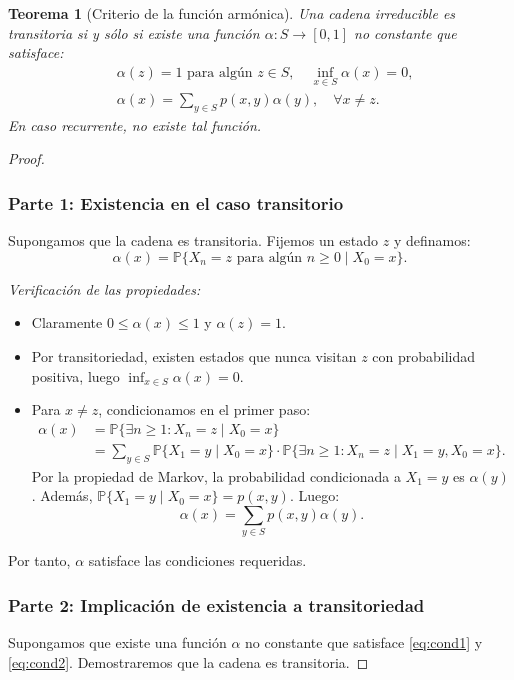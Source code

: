 \documentclass[11pt,a4paper]{article}
\theoremstyle{plain}
\newtheorem{teorema}{Teorema}[section]
\theoremstyle{definition}
\theoremstyle{remark}
\newcommand{\1}{\mathds{1}}
\begin{document}
\begin{teorema}[Criterio de la función armónica]
Una cadena irreducible es transitoria si y sólo si existe una función \(\alpha: S \to [0,1]\) no constante que satisface:
\begin{align}
&\alpha(z) = 1 \text{ para algún } z \in S, \quad \inf_{x\in S} \alpha(x) = 0, \label{eq:cond1}\\
&\alpha(x) = \sum_{y\in S} p(x,y)\alpha(y), \quad \forall x \neq z. \label{eq:cond2}
\end{align}
En caso recurrente, no existe tal función.
\end{teorema}

\begin{proof}
\subsubsection*{Parte 1: Existencia en el caso transitorio}
Supongamos que la cadena es transitoria. Fijemos un estado \(z\) y definamos:
\[
\alpha(x) = \mathbb{P}\{X_n = z \text{ para algún } n \geq 0 \mid X_0 = x\}.
\]

\emph{Verificación de las propiedades:}
\begin{itemize}
\item Claramente \(0 \leq \alpha(x) \leq 1\) y \(\alpha(z) = 1\).
\item Por transitoriedad, existen estados que nunca visitan \(z\) con probabilidad positiva, luego \(\inf_{x\in S} \alpha(x) = 0\).
\item Para \(x \neq z\), condicionamos en el primer paso:
\[
\begin{aligned}
\alpha(x) &= \mathbb{P}\{\exists n \geq 1: X_n = z \mid X_0 = x\} \\
&= \sum_{y\in S} \mathbb{P}\{X_1 = y \mid X_0 = x\} \cdot \mathbb{P}\{\exists n \geq 1: X_n = z \mid X_1 = y, X_0 = x\}.
\end{aligned}
\]
Por la propiedad de Markov, la probabilidad condicionada a \(X_1 = y\) es \(\alpha(y)\). Además, \(\mathbb{P}\{X_1 = y \mid X_0 = x\} = p(x,y)\). Luego:
\[
\alpha(x) = \sum_{y\in S} p(x,y) \alpha(y).
\]
\end{itemize}
Por tanto, \(\alpha\) satisface las condiciones requeridas.

\subsubsection*{Parte 2: Implicación de existencia a transitoriedad}
Supongamos que existe una función \(\alpha\) no constante que satisface \eqref{eq:cond1} y \eqref{eq:cond2}. Demostraremos que la cadena es transitoria.


\end{proof}
\end{document}

